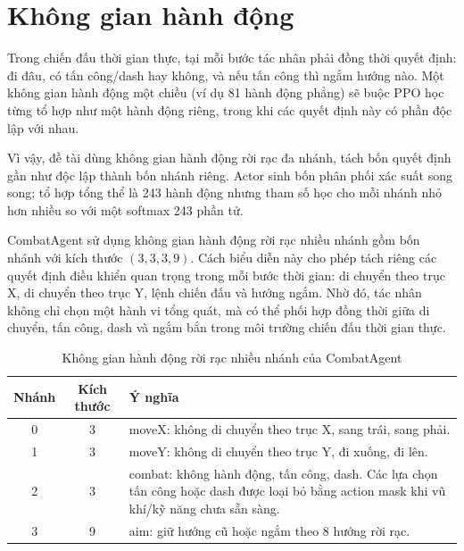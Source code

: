\section{Không gian hành động}

Trong chiến đấu thời gian thực, tại mỗi bước tác nhân phải đồng thời quyết định: đi đâu, có tấn công/dash hay không, và nếu tấn công thì ngắm hướng nào. Một không gian hành động một chiều (ví dụ 81 hành động phẳng) sẽ buộc PPO học từng tổ hợp như một hành động riêng, trong khi các quyết định này có phần độc lập với nhau.

Vì vậy, đề tài dùng không gian hành động rời rạc đa nhánh, tách bốn quyết định gần như độc lập thành bốn nhánh riêng. Actor sinh bốn phân phối xác suất song song; tổ hợp tổng thể là 243 hành động nhưng tham số học cho mỗi nhánh nhỏ hơn nhiều so với một softmax 243 phần tử.

CombatAgent sử dụng không gian hành động rời rạc nhiều nhánh gồm bốn nhánh với kích thước $(3,3,3,9)$. Cách biểu diễn này cho phép tách riêng các quyết định điều khiển quan trọng trong mỗi bước thời gian: di chuyển theo trục X, di chuyển theo trục Y, lệnh chiến đấu và hướng ngắm. Nhờ đó, tác nhân không chỉ chọn một hành vi tổng quát, mà có thể phối hợp đồng thời giữa di chuyển, tấn công, dash và ngắm bắn trong môi trường chiến đấu thời gian thực.

\begin{table}[H]
    \centering
    \small
    \caption{Không gian hành động rời rạc nhiều nhánh của CombatAgent}
    \label{tab:action_space}
    \begin{tabular}{|c|c|p{9cm}|}
        \hline
        \textbf{Nhánh} & \textbf{Kích thước} & \textbf{Ý nghĩa} \\
        \hline
        0 & 3 & moveX: không di chuyển theo trục X, sang trái, sang phải. \\
        \hline
        1 & 3 & moveY: không di chuyển theo trục Y, đi xuống, đi lên. \\
        \hline
        2 & 3 & combat: không hành động, tấn công, dash. Các lựa chọn tấn công hoặc dash được loại bỏ bằng action mask khi vũ khí/kỹ năng chưa sẵn sàng. \\
        \hline
        3 & 9 & aim: giữ hướng cũ hoặc ngắm theo 8 hướng rời rạc. \\
        \hline
    \end{tabular}
\end{table}

